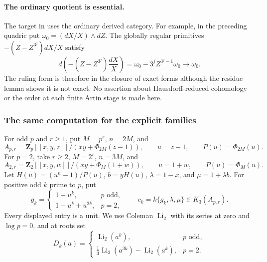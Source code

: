 \paragraph{The ordinary quotient is essential.}
The target in \cite[Constructions~4.6 and~4.11]{AMMN} uses the
ordinary derived category. For example, in the preceding quadric put
$\omega_0=(dX/X)\wedge dZ$. The globally regular primitives
$-(Z-Z^{3^j})dX/X$ satisfy
\[
 d\!\left(-(Z-Z^{3^j})\frac{dX}{X}\right)
   =\omega_0-3^jZ^{3^j-1}\omega_0\longrightarrow\omega_0.
\]
The ruling form is therefore in the closure of exact forms although
the residue lemma shows it is not exact. No assertion about
Hausdorff-reduced cohomology or the order at each finite Artin stage
is made here.

\subsubsection{The same computation for the explicit families}

For odd $p$ and $r\ge1$, put $M=p^r$, $n=2M$, and
\[
 A_{p,r}=\mathbf Z_p[[x,y,z]]/(xy+\Phi_{2M}(z-1)),
 \qquad u=z-1,\qquad P(u)=\Phi_{2M}(u).
\]
For $p=2$, take $r\ge2$, $M=2^r$, $n=3M$, and
\[
 A_{2,r}=\mathbf Z_2[[x,y,w]]/(xy+\Phi_M(1+w)),
 \qquad u=1+w,\qquad P(u)=\Phi_M(u).
\]
Let $H(u)=(u^n-1)/P(u)$, $b=yH(u)$,
$\lambda=1-x$, and $\mu=1+\lambda b$. For positive odd $k$ prime
to $p$, put
\[
 g_k=\begin{cases}1-u^k,&p\text{ odd},\\
                  1+u^k+u^{2k},&p=2,
       \end{cases}
 \qquad c_k=k\{g_k,\lambda,\mu\}\in K_3(A_{p,r}).
\]
Every displayed entry is a unit. We use Coleman $\operatorname{Li}_2$
with its series at zero and $\log p=0$, and at roots set
\[
 D_k(a)=\begin{cases}
       \operatorname{Li}_2(a^k),&p\text{ odd},\\
       \tfrac13\operatorname{Li}_2(a^{3k})-
                        \operatorname{Li}_2(a^k),&p=2.
       \end{cases}
\]

